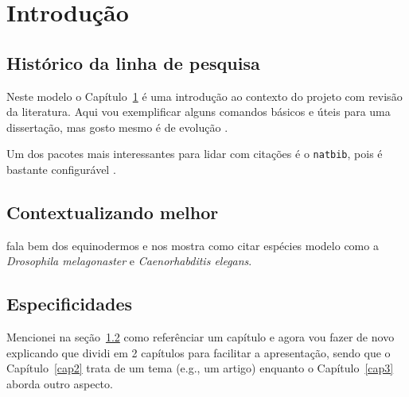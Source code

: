 \chapter{Introdução}\label{intro}
\section{Histórico da linha de pesquisa}\label{intro:historico}


Neste modelo o Capítulo~\ref{intro} é uma introdução ao contexto do projeto com revisão da literatura.
Aqui vou exemplificar alguns comandos básicos e úteis para uma dissertação, mas gosto mesmo é de evolução \citep{Buss1987,Kutschera2004}.

Um dos pacotes mais interessantes para lidar com citações é o \texttt{natbib}, pois é bastante configurável \citep[ver detalhes sobre as reviravoltas da evolução em][]{Buss1987,Arthur2002}.

\section{Contextualizando melhor}\label{intro:contexto}

\citet{Hart2002} fala bem dos equinodermos e nos mostra como citar espécies modelo como a \emph{Drosophila melagonaster} e \emph{Caenorhabditis elegans}.

\section{Especificidades}\label{intro:especs}

Mencionei na seção~\ref{intro:contexto} como referênciar um capítulo e agora vou fazer de novo explicando que dividi em 2 capítulos para facilitar a apresentação, sendo que o Capítulo~\ref{cap2} trata de um tema (e.g., um artigo) enquanto o Capítulo~\ref{cap3} aborda outro aspecto.
\clearpage{\pagestyle{empty}\cleardoublepage}
